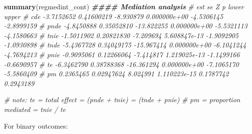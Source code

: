 \documentclass[
]{book}
\newenvironment{Shaded}{\begin{snugshade}}{\end{snugshade}}
\newcommand{\CommentTok}[1]{\textcolor[rgb]{0.56,0.35,0.01}{\textit{#1}}}
\newcommand{\DocumentationTok}[1]{\textcolor[rgb]{0.56,0.35,0.01}{\textbf{\textit{#1}}}}
\newcommand{\FunctionTok}[1]{\textcolor[rgb]{0.13,0.29,0.53}{\textbf{#1}}}
\newcommand{\NormalTok}[1]{#1}
\begin{document}
\begin{Shaded}
\begin{Highlighting}[]
\FunctionTok{summary}\NormalTok{(regmedint\_cont)}
\DocumentationTok{\#\#\#\# Mediation analysis}
\CommentTok{\#             est         se          Z            p      lower      upper}
\CommentTok{\# cde  {-}3.7152652 0.41600219  {-}8.930879 0.000000e+00 {-}4.5306145 {-}2.8999159}
\CommentTok{\# pnde {-}4.8450888 0.35052810 {-}13.822255 0.000000e+00 {-}5.5321113 {-}4.1580663}
\CommentTok{\# tnie {-}1.5011902 0.20821830  {-}7.209694 5.608847e{-}13 {-}1.9092905 {-}1.0930898}
\CommentTok{\# tnde {-}5.4367728 0.34049175 {-}15.967414 0.000000e+00 {-}6.1041244 {-}4.7694213}
\CommentTok{\# pnie {-}0.9095061 0.12266064  {-}7.414817 1.219025e{-}13 {-}1.1499166 {-}0.6690957}
\CommentTok{\# te   {-}6.3462790 0.38788368 {-}16.361294 0.000000e+00 {-}7.1065170 {-}5.5860409}
\CommentTok{\# pm    0.2365465 0.02947624   8.024991 1.110223e{-}15  0.1787742  0.2943189}

\CommentTok{\# note: te = total effect = (pnde + tnie) = (tnde + pnie)}
\CommentTok{\#       pm = proportion mediated = tnie / te}
\end{Highlighting}
\end{Shaded}

For binary outcomes:
\end{document}
